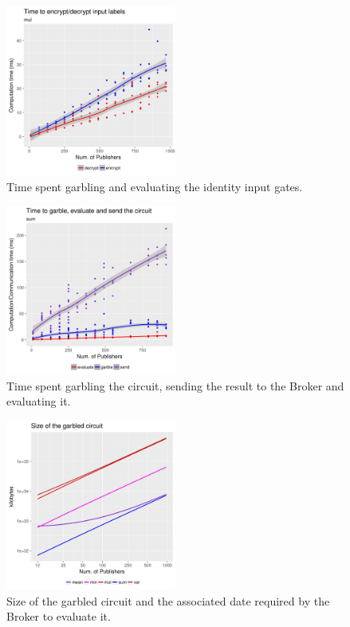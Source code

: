 \begin{figure}
  \includegraphics[width=0.5\textwidth]{plots/enc_dec_inputs.png}
  \caption{Time spent garbling and evaluating the identity input gates.}
\end{figure}

\begin{figure}
  \includegraphics[width=0.5\textwidth]{plots/sum_circuit_2017-05-15.png}
  \caption{Time spent garbling the circuit, sending the result to the Broker and evaluating it.}
\end{figure}


\begin{figure}
  \includegraphics[width=0.5\textwidth]{plots/size_log.png}
  \caption{Size of the garbled circuit and the associated date required by the
  Broker to evaluate it.}
\end{figure}

